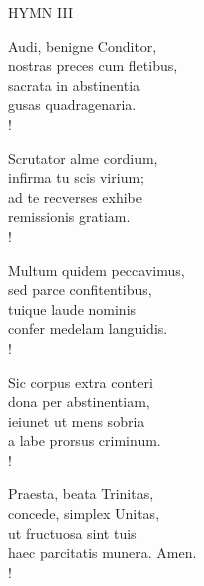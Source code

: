 \noindent\small{\uppercase{Hymn III }}\normalsize\label{lent:lastHymn}
\begin{cverse}
Audi, benigne Conditor,\\
nostras preces cum fletibus,\\
sacrata in abstinentia\\
gusas quadragenaria.\\!

Scrutator alme cordium,\\
infirma tu scis virium;\\
ad te recverses exhibe\\
remissionis gratiam.\\!

Multum quidem peccavimus,\\
sed parce confitentibus,\\
tuique laude nominis\\
confer medelam languidis.\\!

Sic corpus extra conteri\\
dona per abstinentiam,\\
ieiunet ut mens sobria\\
a labe prorsus criminum.\\!

Praesta, beata Trinitas,\\
concede, simplex Unitas,\\
ut fructuosa sint tuis\\
haec parcitatis munera. Amen.\\!
\end{cverse}
